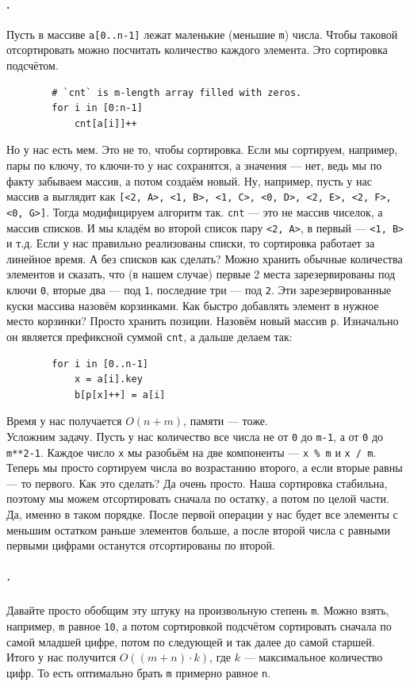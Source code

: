 \documentclass{article}
\newcommand{\pseudo}{PseudoLexer.py:PseudoLexer -x}
\newcommand{\pseudocode}[1]{\texttt{#1}}
\begin{document}
    \paragraph{.}
    Пусть в массиве \pseudocode{a[0..n-1]} лежат маленькие (меньшие \pseudocode{m}) числа. Чтобы таковой отсортировать можно посчитать количество каждого элемента. Это сортировка подсчётом.
    \begin{verbatim}
        # `cnt` is m-length array filled with zeros.
        for i in [0:n-1]
            cnt[a[i]]++
    \end{verbatim}
    Но у нас есть мем. Это не то, чтобы сортировка. Если мы сортируем, например, пары по ключу, то ключи-то у нас сохранятся, а значения --- нет, ведь мы по факту забываем массив, а потом создаём новый. Ну, например, пусть у нас массив \pseudocode{a} выглядит как \pseudocode{[<2, A>, <1, B>, <1, C>, <0, D>, <2, E>, <2, F>, <0, G>]}. Тогда модифицируем алгоритм так. \pseudocode{cnt} --- это не массив чиселок, а массив списков. И мы кладём во второй список пару \pseudocode{<2, A>}, в первый --- \pseudocode{<1, B>} и т.д. Если у нас правильно реализованы списки, то сортировка работает за линейное время. А без списков как сделать? Можно хранить обычные количества элементов и сказать, что (в нашем случае) первые 2 места зарезервированы под ключи \pseudocode{0}, вторые два --- под \pseudocode{1}, последние три --- под \pseudocode{2}. Эти зарезервированные куски массива назовём корзинками. Как быстро добавлять элемент в нужное место корзинки? Просто хранить позиции. Назовём новый массив \pseudocode{p}. Изначально он является префиксной суммой \pseudocode{cnt}, а дальше делаем так:
    \begin{verbatim}
        for i in [0..n-1]
            x = a[i].key
            b[p[x]++] = a[i]
    \end{verbatim}
    Время у нас получается $O(n+m)$, памяти --- тоже.\\
    Усложним задачу. Пусть у нас количество все числа не от \pseudocode0 до \pseudocode{m-1}, а от \pseudocode0 до \pseudocode{m**2-1}. Каждое число \pseudocode{x} мы разобьём на две компоненты --- \texttt{x \% m} и \pseudocode{x / m}.
    Теперь мы просто сортируем числа во возрастанию второго, а если вторые равны --- то первого. Как это сделать? Да очень просто. Наша сортировка стабильна, поэтому мы можем отсортировать сначала по остатку, а потом по целой части. Да, именно в таком порядке. После первой операции у нас будет все элементы с меньшим остатком раньше элементов больше, а после второй числа с равными первыми цифрами останутся отсортированы по второй.
    \subparagraph{.}
    Давайте просто обобщим эту штуку на произвольную степень \pseudocode{m}. Можно взять, например, \pseudocode{m} равное \pseudocode{10}, а потом сортировкой подсчётом сортировать сначала по самой младшей цифре, потом по следующей и так далее до самой старшей. Итого у нас получится $O((m+n)\cdot k)$, где $k$ --- максимальное количество цифр. То есть оптимально брать \pseudocode{m} примерно равное \pseudocode{n}.
\end{document}
